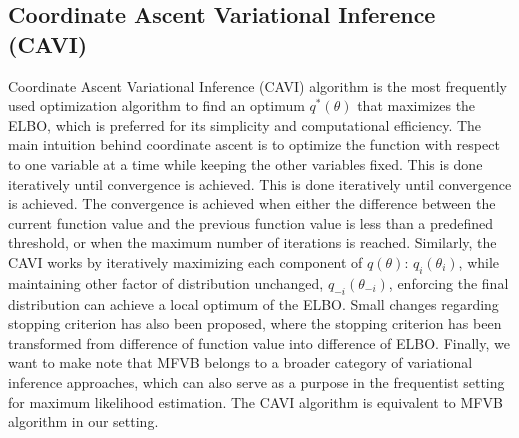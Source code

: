 \subsection{Coordinate Ascent Variational Inference (CAVI)}
Coordinate Ascent Variational Inference (CAVI) algorithm is the most frequently used optimization algorithm to find an optimum $q^*(\theta)$ that maximizes the ELBO, which is preferred for its simplicity and computational efficiency. The main intuition behind coordinate ascent is to optimize the function with respect to one variable at a time while keeping the other variables fixed. This is done iteratively until convergence is achieved. This is done iteratively until convergence is achieved. The convergence is achieved when either the difference between the current function value and the previous function value is less than a predefined threshold, or when the maximum number of iterations is reached.
Similarly, the CAVI works by iteratively maximizing each component of $q(\theta)$: $q_i(\theta_i)$, while maintaining other factor of distribution unchanged, $q_{-i}(\theta_{-i})$, enforcing the final distribution can achieve a local optimum of the ELBO. 
Small changes regarding stopping criterion has also been proposed, where the stopping criterion has been transformed from difference of function value into difference of ELBO.
Finally, we want to make note that MFVB belongs to a broader category of variational inference approaches, which can also serve as a purpose in the frequentist setting for maximum likelihood estimation. The CAVI algorithm is equivalent to MFVB algorithm in our setting.

